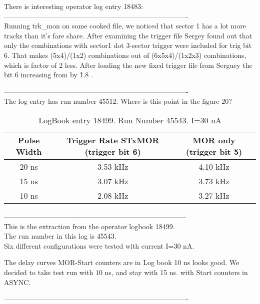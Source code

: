 \documentclass[12pt]{article}
\begin{document}
There is interesting operator log entry 18483:\\
-------------------------------------------------------------------------------\\
Running trk\_mon on some cooked file, we noticed that sector 1 has a lot more tracks than it's fare share. After examining the trigger file Sergey found out that only the combinations with sector1 dot 3-sector trigger were included for trig bit 6. That makes (5x4)/(1x2) combinations out of (6x5x4)/(1x2x3) combinations, which is factor of 2 less. After loading the new fixed trigger file from Serguey the bit 6 increasing from by \~1.8 . 

-------------------------------------------------------------------------------\\
The log entry has run number 45512. Where is this point in the figure 20?

\begin{table}[h]
\begin{center}
\begin{tabular}{|c|c|c|} \hline
Pulse Width& Trigger Rate STxMOR (trigger bit 6)& MOR only (trigger bit 5) \\
\hline \hline
20 ns & 3.53 kHz & 4.10 kHz \\
15 ns & 3.07 kHz & 3.73 kHz \\
10 ns& 2.08 kHz  & 3.27 kHz\\

\hline
\end{tabular}
\end{center}
\caption {LogBook entry 18499. Run Number 45543. I=30 nA}
\label{tab:trstudy}
\end{table}


------------------------------------------------------------------------------\\
This is  the extraction from the operator logbook 18499.\\
The run number in this log is 45543.\\

Six different configurations were tested with current I=30 nA.



The delay curves MOR-Start counters are in Log book 
10 ns looks good. We decided to take test run with 10 ns, 
and stay with 15 ns. with Start counters in ASYNC. 

-------------------------------------------------------------------------------\\
\end{document}
